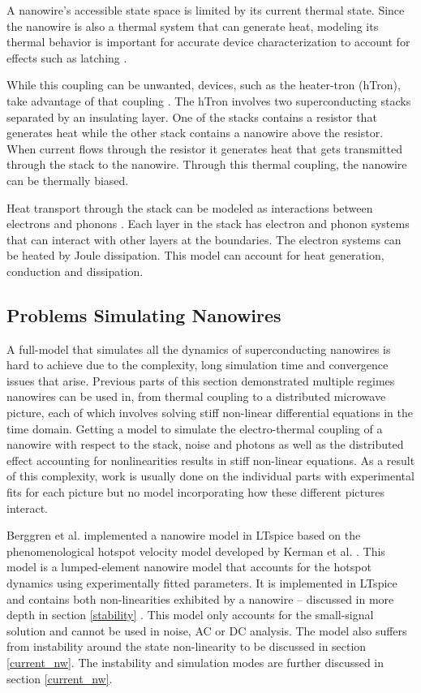 A nanowire's accessible state space is limited by its current thermal state.
Since the nanowire is also a thermal system that can generate heat,
modeling its thermal behavior is important for
accurate device characterization to account for effects such as latching 
\cite{electro_thermal_modelling}.

While this coupling can be unwanted, devices, such as the heater-tron (hTron), 
take advantage of that coupling \cite{htron_paper}. 
The hTron involves two superconducting stacks separated
by an insulating layer. One of the stacks contains a resistor that generates heat while the
other stack contains a nanowire above the resistor. When current flows through the resistor
it generates heat that gets transmitted through the stack to the nanowire. Through this thermal
coupling, the nanowire can be thermally biased.

Heat transport through the stack can be modeled as interactions between electrons 
and phonons \cite{htron_paper}. Each layer in the stack has
electron and phonon systems that can interact with other
layers at the boundaries.
The electron systems can be heated by Joule dissipation.
This model can account for heat generation, conduction
and dissipation.


\subsection{Problems Simulating Nanowires}

A full-model that simulates all the dynamics of superconducting nanowires is hard to achieve
due to the complexity, long simulation time and convergence issues
that arise.
Previous parts of this section demonstrated multiple regimes nanowires can be used in,
from thermal coupling to a distributed microwave picture, each of which involves solving
stiff non-linear differential equations in the time domain. Getting a model to simulate
the electro-thermal coupling of a nanowire with respect to the stack, noise and photons
as well as the distributed effect accounting for nonlinearities results in stiff non-linear
equations. 
As a result of this complexity, work is usually done on the individual parts
with experimental fits for each picture but no model incorporating how these
different pictures interact. 

Berggren et al. implemented a nanowire model in LTspice based on the phenomenological hotspot 
velocity model developed by Kerman et al. \cite{karl_spice, phen_model}. 
This model is a lumped-element nanowire model that accounts 
for the hotspot dynamics using experimentally fitted parameters. It is implemented in LTspice
and contains both non-linearities exhibited by a nanowire -- discussed in more depth 
in section \ref{stability} \cite{karl_spice}. This model only 
accounts for the small-signal solution and cannot be used in noise, AC or DC analysis.
The model also suffers from instability around the state non-linearity to be discussed in section \ref{current_nw}. The instability and 
simulation modes are further discussed in section \ref{current_nw}.

